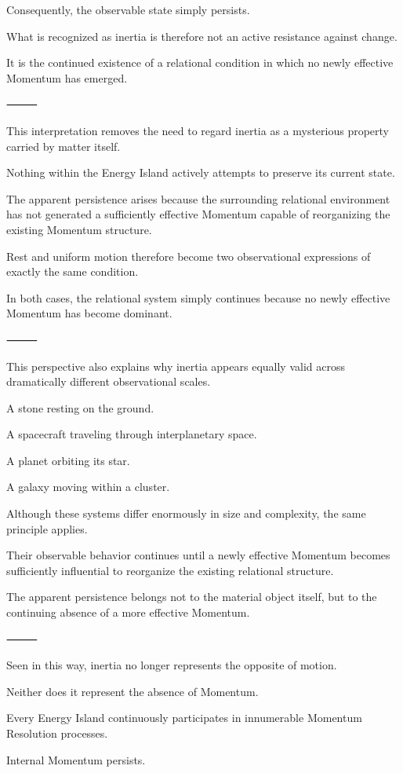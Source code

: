 Consequently, the observable state simply persists.

What is recognized as inertia is therefore not an active resistance against change.

It is the continued existence of a relational condition in which no newly effective Momentum has emerged.

⸻

This interpretation removes the need to regard inertia as a mysterious property carried by matter itself.

Nothing within the Energy Island actively attempts to preserve its current state.

The apparent persistence arises because the surrounding relational environment has not generated a sufficiently effective Momentum capable of reorganizing the existing Momentum structure.

Rest and uniform motion therefore become two observational expressions of exactly the same condition.

In both cases, the relational system simply continues because no newly effective Momentum has become dominant.

⸻

This perspective also explains why inertia appears equally valid across dramatically different observational scales.

A stone resting on the ground.

A spacecraft traveling through interplanetary space.

A planet orbiting its star.

A galaxy moving within a cluster.

Although these systems differ enormously in size and complexity, the same principle applies.

Their observable behavior continues until a newly effective Momentum becomes sufficiently influential to reorganize the existing relational structure.

The apparent persistence belongs not to the material object itself, but to the continuing absence of a more effective Momentum.

⸻

Seen in this way, inertia no longer represents the opposite of motion.

Neither does it represent the absence of Momentum.

Every Energy Island continuously participates in innumerable Momentum Resolution processes.

Internal Momentum persists.

